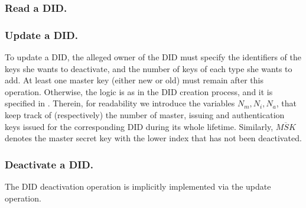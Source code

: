 
\subsubsection{Read a DID.} 

\subsubsection{Update a DID.} %
To update a DID, the alleged owner of the DID must specify the identifiers of
the keys she wants to deactivate, and the number of keys of each type she wants
to add. At least one master key (either new or old) must remain after this
operation. Otherwise, the logic is as in the DID creation process, and it is
specified in . Therein, for readability we introduce the
variables $N_m,N_i,N_a$, that keep track of (respectively) the number of master,
issuing and authentication keys issued for the corresponding DID during its
whole lifetime. Similarly, $\overline{MSK}$ denotes the master secret key with
the lower index that has not been deactivated.

\subsubsection{Deactivate a DID.} %
The DID deactivation operation is implicitly implemented via the update
operation. 

